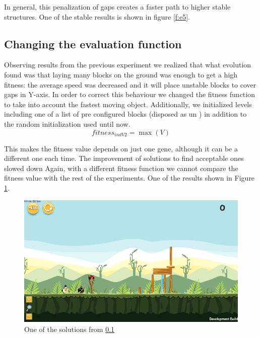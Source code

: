 \documentclass[sigconf]{acmart}
\begin{document}
In general, this penalization of gaps creates a faster path to higher stable
structures.
One of the stable results is shown in figure \ref{f:e5}.

\subsection{Changing the evaluation function}\label{E6}

Observing results from the previous experiment we realized that what
evolution found was that laying many blocks on the ground was enough
to get a high fitness: the average speed was decreased and it will
place unstable blocks to cover gaps in Y-axis. 
In order to correct this behaviour we changed the 
fitness function to take into account the fastest moving object. 
Additionally, we initialized levels including one of a list of pre configured
blocks (disposed as un \cite{ferreira2014search}) in addition to the random initialization used until now.
$$fitness_{indV2} = \max{(V)}$$

This makes the fitness value depends on just one gene, although it can be a
different one each time. The improvement of solutions to find acceptable ones
slowed down %
Again, with a different fitness function we cannot compare the fitness
value with the rest of the experiments. One of the results shown in 
Figure \ref{f:e6}.
 \begin{figure}
 	\centering
 	\includegraphics[scale=0.3]{E6.png}
 	\caption{One of the solutions from \ref{E6}}\label{f:e6}
 \end{figure}
\end{document}
